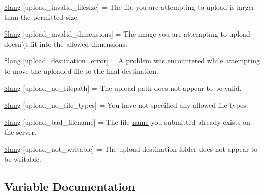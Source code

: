 \begin{DoxyCompactItemize}
\item 
\mbox{\hyperlink{upload__lang_8php_a9e27dcfe81917319e2dccfbec17161eb}{\$lang}} \mbox{[}\textquotesingle{}upload\+\_\+invalid\+\_\+filesize\textquotesingle{}\mbox{]} = \textquotesingle{}The file you are attempting to upload is larger than the permitted size.\textquotesingle{}
\item 
\mbox{\hyperlink{upload__lang_8php_a4055120be986694e0ff7d696e26d9395}{\$lang}} \mbox{[}\textquotesingle{}upload\+\_\+invalid\+\_\+dimensions\textquotesingle{}\mbox{]} = \textquotesingle{}The image you are attempting to upload doesn\textbackslash{}\textquotesingle{}t fit into the allowed dimensions.\textquotesingle{}
\item 
\mbox{\hyperlink{upload__lang_8php_ae65b8eeac589242cd57cecdb023f4564}{\$lang}} \mbox{[}\textquotesingle{}upload\+\_\+destination\+\_\+error\textquotesingle{}\mbox{]} = \textquotesingle{}A problem was encountered while attempting to move the uploaded file to the final destination.\textquotesingle{}
\item 
\mbox{\hyperlink{upload__lang_8php_a8f360e9254fa8e42d23c2261fa613505}{\$lang}} \mbox{[}\textquotesingle{}upload\+\_\+no\+\_\+filepath\textquotesingle{}\mbox{]} = \textquotesingle{}The upload path does not appear to be valid.\textquotesingle{}
\item 
\mbox{\hyperlink{upload__lang_8php_a36a638dbb92bbafa88689e777b5d0a67}{\$lang}} \mbox{[}\textquotesingle{}upload\+\_\+no\+\_\+file\+\_\+types\textquotesingle{}\mbox{]} = \textquotesingle{}You have not specified any allowed file types.\textquotesingle{}
\item 
\mbox{\hyperlink{upload__lang_8php_a26c58f27f690177bbe6e096348076d0e}{\$lang}} \mbox{[}\textquotesingle{}upload\+\_\+bad\+\_\+filename\textquotesingle{}\mbox{]} = \textquotesingle{}The file \mbox{\hyperlink{waiter_2order_8php_afb270cde4944e425a37cf277116a7f43}{name}} you submitted already exists on the server.\textquotesingle{}
\item 
\mbox{\hyperlink{upload__lang_8php_a3cd474af7c7e6c1d7f28342914cdae40}{\$lang}} \mbox{[}\textquotesingle{}upload\+\_\+not\+\_\+writable\textquotesingle{}\mbox{]} = \textquotesingle{}The upload destination folder does not appear to be writable.\textquotesingle{}
\end{DoxyCompactItemize}


\subsection{Variable Documentation}
\mbox{\label{upload__lang_8php_aa4b26b58d6f43453951a13be6cc0b518}} 

